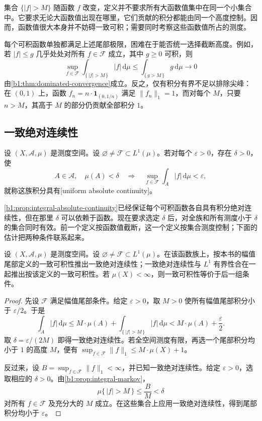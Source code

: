 集合 \(\{|f|>M\}\) 随函数 \(f\) 改变，定义并不要求所有大函数值集中在同一个小集合中。它要求无论大函数值出现在哪里，它们贡献的积分都能由同一个高度控制。因而，函数值很大本身并不妨碍一致可积；需要同时考察这些函数值所占的测度。

\ProseParagraphBreak

每个可积函数单独都满足上述尾部极限，困难在于能否统一选择截断高度。例如，若 \(|f|\leq g\) 几乎处处对所有 \(f\in\mathcal F\) 成立，其中 \(g\geq0\) 可积，则
\[
\sup_{f\in\mathcal F}\int_{\{\,|f|>M\,\}}|f|\,\mathrm d\mu
\leq\int_{\{\,g>M\,\}}g\,\mathrm d\mu
\longrightarrow0
\]
由\cref{b1:thm:dominated-convergence}成立。反之，仅有积分有界不足以排除尖峰：在 \((0,1)\) 上，函数 \(f_n=n\cdot\mathbf 1_{(0,1/n)}\) 满足 \(\|f_n\|_1=1\)，而对每个 \(M\)，只要 \(n>M\)，其高于 \(M\) 的部分仍贡献全部积分 \(1\)。

\subsection{一致绝对连续性}
\label{b1:subsec:050502}

\begin{definition}
\label{b1:def:uniform-absolute-continuity}
设 \((X,\mathcal A,\mu)\) 是测度空间。设 \(\varnothing\ne\mathcal F\subset L^1(\mu)\)。若对每个 \(\varepsilon>0\)，存在 \(\delta>0\)，使
\[
A\in\mathcal A,\quad\mu(A)<\delta
\quad\Longrightarrow\quad
\sup_{f\in\mathcal F}\int_A|f|\,\mathrm d\mu<\varepsilon,
\]
就称这族积分具有[uniform absolute continuity]。
\end{definition}

\cref{b1:prop:integral-absolute-continuity}已经保证每个可积函数各自具有积分绝对连续性，但在那里 \(\delta\) 可以依赖于函数。现在要求选定 \(\delta\) 后，对全族和所有测度小于 \(\delta\) 的集合同时有效。前一个定义按函数值截断，这一个定义按集合测度控制；下面的估计把两种条件联系起来。

\begin{proposition}
\label{b1:prop:uniform-integrability-criterion}
设 \((X,\mathcal A,\mu)\) 是测度空间。设 \(\varnothing\ne\mathcal F\subset L^1(\mu)\)。在该函数族上，按本书的幅值尾部定义的一致可积性推出一致绝对连续性；一致绝对连续性与 \(L^1\) 有界性合在一起推出按该定义的一致可积性。若 \(\mu(X)<\infty\)，则一致可积性等价于后一组条件。
\end{proposition}

\begin{proof}
先设 \(\mathcal F\) 满足幅值尾部条件。给定 \(\varepsilon>0\)，取 \(M>0\) 使所有幅值尾部积分小于 \(\varepsilon/2\)。于是
\[
\int_A|f|\,\mathrm d\mu
\leq M\cdot\mu(A)+\int_{\{\,|f|>M\,\}}|f|\,\mathrm d\mu
<M\cdot\mu(A)+\frac{\varepsilon}{2}.
\]
取 \(\delta=\varepsilon/(2M)\) 即得一致绝对连续性。若全空间测度有限，再选一个尾部积分均小于 \(1\) 的高度 \(M\)，便有 \(\sup_{f\in\mathcal F}\|f\|_1\leq M\cdot\mu(X)+1\)。

反过来，设 \(B=\sup_{f\in\mathcal F}\|f\|_1<\infty\)，并已知一致绝对连续性。给定 \(\varepsilon>0\)，选取相应的 \(\delta>0\)。由\cref{b1:prop:integral-markov}，
\[
\mu\{\,|f|>M\,\}\leq\frac{B}{M}<\delta
\]
对所有 \(f\in\mathcal F\) 及充分大的 \(M\) 成立。在这些集合上应用一致绝对连续性，得到尾部积分均小于 \(\varepsilon\)。
\end{proof}

